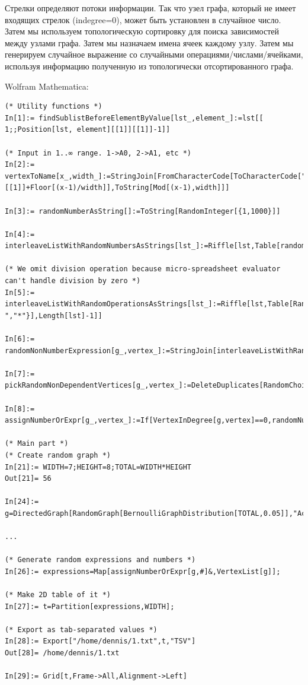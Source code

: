 Стрелки определяют потоки информации.
Так что узел графа, который не имеет входящих стрелок (indegree=0), может быть установлен в случайное число.
Затем мы используем топологическую сортировку для поиска зависимостей между узлами графа.
Затем мы назначаем имена ячеек каждому узлу.
Затем мы генерируем случайное выражение со случайными операциями/числами/ячейками, используя информацию
полученную из топологически отсортированного графа.

Wolfram Mathematica:

\begin{lstlisting}
(* Utility functions *)
In[1]:= findSublistBeforeElementByValue[lst_,element_]:=lst[[ 1;;Position[lst, element][[1]][[1]]-1]]

(* Input in 1..∞ range. 1->A0, 2->A1, etc *)
In[2]:= vertexToName[x_,width_]:=StringJoin[FromCharacterCode[ToCharacterCode["A"][[1]]+Floor[(x-1)/width]],ToString[Mod[(x-1),width]]]

In[3]:= randomNumberAsString[]:=ToString[RandomInteger[{1,1000}]]

In[4]:= interleaveListWithRandomNumbersAsStrings[lst_]:=Riffle[lst,Table[randomNumberAsString[],Length[lst]-1]]

(* We omit division operation because micro-spreadsheet evaluator can't handle division by zero *)
In[5]:= interleaveListWithRandomOperationsAsStrings[lst_]:=Riffle[lst,Table[RandomChoice[{"+","-","*"}],Length[lst]-1]]

In[6]:= randomNonNumberExpression[g_,vertex_]:=StringJoin[interleaveListWithRandomOperationsAsStrings[interleaveListWithRandomNumbersAsStrings[Map[vertexToName[#,WIDTH]&,pickRandomNonDependentVertices[g,vertex]]]]]

In[7]:= pickRandomNonDependentVertices[g_,vertex_]:=DeleteDuplicates[RandomChoice[findSublistBeforeElementByValue[TopologicalSort[g],vertex],RandomInteger[{1,5}]]]

In[8]:= assignNumberOrExpr[g_,vertex_]:=If[VertexInDegree[g,vertex]==0,randomNumberAsString[],randomNonNumberExpression[g,vertex]]

(* Main part *) 
(* Create random graph *)
In[21]:= WIDTH=7;HEIGHT=8;TOTAL=WIDTH*HEIGHT
Out[21]= 56

In[24]:= g=DirectedGraph[RandomGraph[BernoulliGraphDistribution[TOTAL,0.05]],"Acyclic"];

...

(* Generate random expressions and numbers *)
In[26]:= expressions=Map[assignNumberOrExpr[g,#]&,VertexList[g]];

(* Make 2D table of it *)
In[27]:= t=Partition[expressions,WIDTH];

(* Export as tab-separated values *)
In[28]:= Export["/home/dennis/1.txt",t,"TSV"]
Out[28]= /home/dennis/1.txt

In[29]:= Grid[t,Frame->All,Alignment->Left]
\end{lstlisting}

